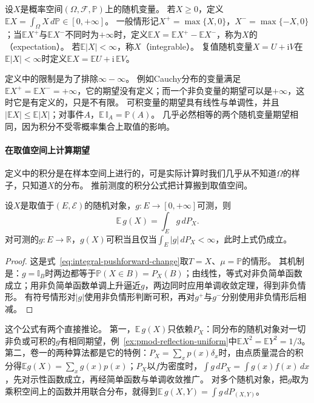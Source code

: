 \begin{definition}[期望]
\label{def:pmod-expectation}
设$X$是概率空间$(\Omega,\mathcal F,\mathbb P)$上的随机变量。
若$X\ge0$，定义$\mathbb E X=\int_\Omega X\,d\mathbb P\in[0,+\infty]$。
一般情形记$X^+=\max\{X,0\}$，$X^-=\max\{-X,0\}$；当$\mathbb EX^+$与$\mathbb EX^-$不同时为$+\infty$时，定义$\mathbb EX=\mathbb EX^+-\mathbb EX^-$，称为$X$的（expectation）。
若$\mathbb E|X|<\infty$，称$X$（integrable）。
复值随机变量$X=U+\mathrm iV$在$\mathbb E|X|<\infty$时定义$\mathbb EX=\mathbb EU+\mathrm i\,\mathbb EV$。
\end{definition}

定义中的限制是为了排除$\infty-\infty$。
例如Cauchy分布的变量满足$\mathbb EX^+=\mathbb EX^-=+\infty$，它的期望没有定义；而一个非负变量的期望可以是$+\infty$，这时它是有定义的，只是不有限。
可积变量的期望具有线性与单调性，并且$|\mathbb EX|\le\mathbb E|X|$；对事件$A$，$\mathbb E\,\mathbb I_A=\mathbb P(A)$。
几乎必然相等的两个随机变量期望相同，因为积分不受零概率集合上取值的影响。

\paragraph{在取值空间上计算期望}
定义中的积分是在样本空间上进行的，可是实际计算时我们几乎从不知道$\Omega$的样子，只知道$X$的分布。
推前测度的积分公式把计算搬到取值空间。

\begin{theorem}[分布积分公式]
\label{thm:pmod-change-of-variables}
设$X$是取值于$(E,\mathcal E)$的随机对象，$g:E\to[0,+\infty]$可测，则
\[
  \mathbb E\,g(X)=\int_Eg\,dP_X.
\]
对可测的$g:E\to\mathbb R$，$g(X)$可积当且仅当$\int_E|g|\,dP_X<\infty$，此时上式仍成立。
\end{theorem}

\begin{proof}
这是式~\eqref{eq:integral-pushforward-change}取$T=X$、$\mu=\mathbb P$的情形。
其机制是：$g=\mathbb I_B$时两边都等于$\mathbb P(X\in B)=P_X(B)$；由线性，等式对非负简单函数成立；用非负简单函数单调上升逼近$g$，两边同时应用单调收敛定理，得到非负情形。
有符号情形对$|g|$使用非负情形判断可积，再对$g^+$与$g^-$分别使用非负情形后相减。
\end{proof}

这个公式有两个直接推论。
第一，$\mathbb E\,g(X)$只依赖$P_X$：同分布的随机对象对一切非负或可积的$g$有相同期望，例~\ref{ex:pmod-reflection-uniform}中$\mathbb EX^2=\mathbb EY^2=1/3$。
第二，卷一的两种算法都是它的特例：$P_X=\sum_xp(x)\delta_x$时，由点质量混合的积分得$\mathbb Eg(X)=\sum_xg(x)p(x)$；$P_X$以$f$为密度时，$\int g\,dP_X=\int g(x)f(x)\,dx$，先对示性函数成立，再经简单函数与单调收敛推广。
对多个随机对象，把$g$取为乘积空间上的函数并用联合分布，就得到$\mathbb E\,g(X,Y)=\int g\,dP_{(X,Y)}$。


